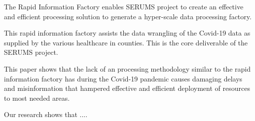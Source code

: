 The Rapid Information Factory enables SERUMS project to create an effective and efficient processing solution to generate a hyper-scale data processing factory.

This rapid information factory assists the data wrangling of the Covid-19 data as supplied by the various healthcare in counties. This is the core deliverable of the SERUMS project.

This paper shows that the lack of an processing methodology similar to the rapid information factory has during the Covid-19 pandemic causes damaging delays and misinformation that hampered effective and efficient deployment of resources to most needed areas.

Our research shows that ....